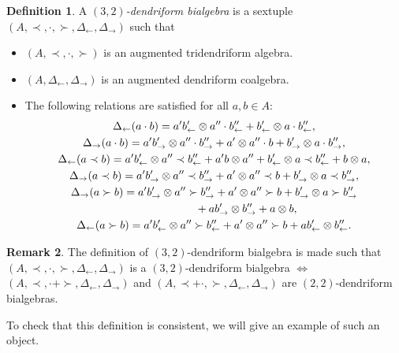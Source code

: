 \documentclass[10pt,a4paper]{amsart}
\numberwithin{equation}{section}
\theoremstyle{definition}
\newtheorem{defi}{Definition}[section]
\newtheorem{Rq}[defi]{Remark}
\theoremstyle{plain}
\begin{document}
 \begin{defi}\label{deftroisdeux}
 	A \emph{$(3,2)$-dendriform bialgebra} is a sextuple $(A,\prec,\cdot,\succ,\Delta_{\leftarrow},\Delta_{\rightarrow})$ such that
 	\begin{itemize}\itemsep=0pt
 		\item $(A,\prec,\cdot,\succ)$ is an augmented tridendriform algebra.
 		\item $(A,\Delta_{\leftarrow},\Delta_{\rightarrow})$ is an augmented dendriform coalgebra.
 		\item The following relations are satisfied for all $a,b\in A$:
 		\begin{gather}
 			\Delta_{\leftarrow}(a\cdot b) =a'b'_{\leftarrow}\otimes a''\cdot b''_{\leftarrow}+b'_{\leftarrow}\otimes a\cdot b''_{\leftarrow}, \label{troisdeuxrel1}\\
 			\Delta_{\rightarrow}(a\cdot b) =a'b'_{\rightarrow}\otimes a''\cdot b''_{\rightarrow}+a'\otimes a''\cdot b+b'_{\rightarrow}\otimes a\cdot b''_{\rightarrow}, \label{troisdeuxrel2}\\
 			\Delta_{\leftarrow}(a\prec b) =a'b'_{\leftarrow}\otimes a''\prec b''_{\leftarrow}+a'b\otimes a'' +b'_{\leftarrow}\otimes a\prec b''_{\leftarrow}+b\otimes a, \label{troisdeuxrel3}\\
 			\Delta_{\rightarrow}(a\prec b) =a'b'_{\rightarrow}\otimes a''\prec b''_{\rightarrow}+a'\otimes a''\prec b +b'_{\rightarrow}\otimes a\prec b''_{\rightarrow},
 			\label{troisdeuxrel4}\\
 			\Delta_{\rightarrow}(a\succ b) =a'b'_{\rightarrow}\otimes a''\succ b''_{\rightarrow}+a'\otimes a''\succ b +b'_{\rightarrow}\otimes a\succ b''_{\rightarrow} \nonumber\\ \hphantom{\Delta_{\rightarrow}(a\succ b) =}{}+ab'_{\rightarrow}\otimes b''_{\rightarrow}+a\otimes b,
 	\label{troisdeuxrel5}		\\
 			\Delta_{\leftarrow}(a\succ b) =a'b'_{\leftarrow}\otimes a''\succ b''_{\leftarrow}+a'\otimes a''\succ b +ab'_{\leftarrow}\otimes b''_{\leftarrow}.
 			\label{troisdeuxrel6}
 		\end{gather}
 	\end{itemize}
 \end{defi}
\begin{Rq}
	The definition of $(3,2)$-dendriform bialgebra is made such that
$
	 (A,\prec,\cdot,\succ,\Delta_{\leftarrow},\allowbreak \Delta_{\rightarrow})$ is a $(3,2)$-dendriform bialgebra
		 $\iff$
		 $(A,\prec,\cdot+\succ,\Delta_{\leftarrow},\Delta_{\rightarrow})$ and $(A,\prec+\cdot,\succ,\Delta_{\leftarrow},\Delta_{\rightarrow})$
	 are $(2,2)$-dendriform bialgebras.
\end{Rq}
To check that this definition is consistent, we will give an example of such an object.
\end{document}

